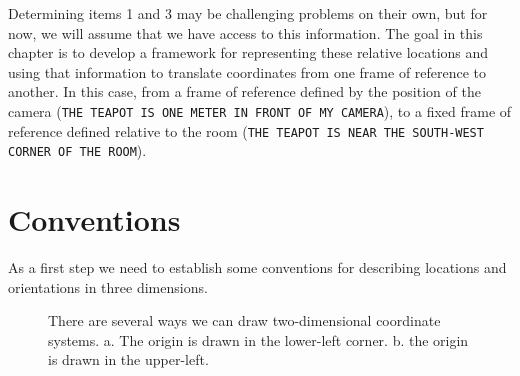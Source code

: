 Determining items 1 and 3 may be challenging problems on their own,
but for now, we will assume that we have access to this information.
The goal in this chapter is to develop a framework for representing
these relative locations and using that information to translate
coordinates from one frame of reference to another.  In this case,
from a frame of reference defined by the position of the camera
(\texttt{THE TEAPOT IS ONE METER IN FRONT OF MY CAMERA}), to a fixed
frame of reference defined relative to the room (\texttt{THE TEAPOT IS
  NEAR THE SOUTH-WEST CORNER OF THE ROOM}).

\section{Conventions}

As a first step we need to establish some conventions for describing
locations and orientations in three dimensions.

\begin{figure}
\begin{center}
\hspace{.75in}
\end{center}
\caption{There are several ways we can draw two-dimensional coordinate systems.  a.  The origin is drawn in the lower-left corner. b. the origin is drawn in the upper-left.}
\label{fig:two_d_coordinates}
\end{figure}


